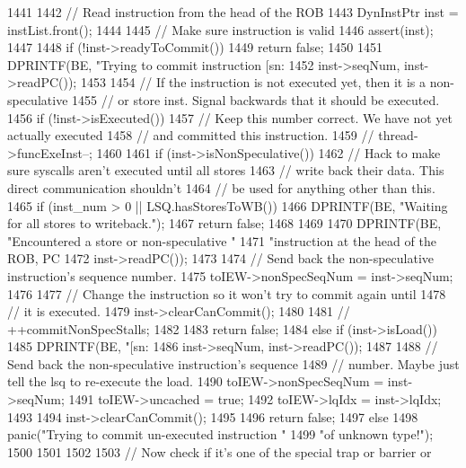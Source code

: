 \begin{DoxyCode}
1441 {
1442     // Read instruction from the head of the ROB
1443     DynInstPtr inst = instList.front();
1444 
1445     // Make sure instruction is valid
1446     assert(inst);
1447 
1448     if (!inst->readyToCommit())
1449         return false;
1450 
1451     DPRINTF(BE, "Trying to commit instruction [sn:%
1452             inst->seqNum, inst->readPC());
1453 
1454     // If the instruction is not executed yet, then it is a non-speculative
1455     // or store inst.  Signal backwards that it should be executed.
1456     if (!inst->isExecuted()) {
1457         // Keep this number correct.  We have not yet actually executed
1458         // and committed this instruction.
1459 //        thread->funcExeInst--;
1460 
1461         if (inst->isNonSpeculative()) {
1462             // Hack to make sure syscalls aren't executed until all stores
1463             // write back their data.  This direct communication shouldn't
1464             // be used for anything other than this.
1465             if (inst_num > 0 || LSQ.hasStoresToWB()) {
1466                 DPRINTF(BE, "Waiting for all stores to writeback.\n");
1467                 return false;
1468             }
1469 
1470             DPRINTF(BE, "Encountered a store or non-speculative "
1471                     "instruction at the head of the ROB, PC %
1472                     inst->readPC());
1473 
1474             // Send back the non-speculative instruction's sequence number.
1475             toIEW->nonSpecSeqNum = inst->seqNum;
1476 
1477             // Change the instruction so it won't try to commit again until
1478             // it is executed.
1479             inst->clearCanCommit();
1480 
1481 //            ++commitNonSpecStalls;
1482 
1483             return false;
1484         } else if (inst->isLoad()) {
1485             DPRINTF(BE, "[sn:%
1486                     inst->seqNum, inst->readPC());
1487 
1488             // Send back the non-speculative instruction's sequence
1489             // number.  Maybe just tell the lsq to re-execute the load.
1490             toIEW->nonSpecSeqNum = inst->seqNum;
1491             toIEW->uncached = true;
1492             toIEW->lqIdx = inst->lqIdx;
1493 
1494             inst->clearCanCommit();
1495 
1496             return false;
1497         } else {
1498             panic("Trying to commit un-executed instruction "
1499                   "of unknown type!\n");
1500         }
1501     }
1502 
1503     // Now check if it's one of the special trap or barrier or
}
\end{DoxyCode}
